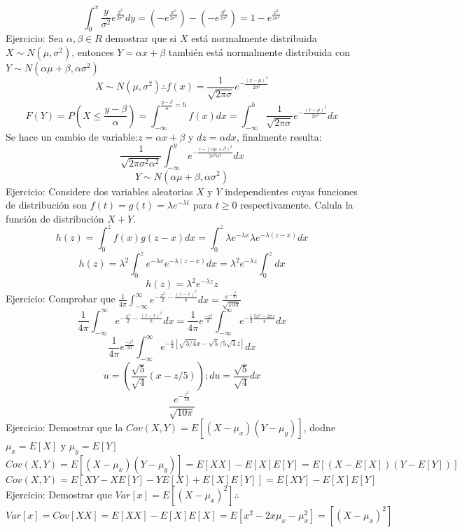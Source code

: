 \documentclass[11pt,fleqn]{book} %
\numberwithin{equation}{section} %
\numberwithin{figure}{section} %
\numberwithin{table}{section} %
\begin{document}
$$ \int_{0}^{x} \frac{y}{\sigma^{2}} e^{\frac{y^{2}}{2\sigma^{2}}} dy = (-e^{\frac{x^{2}}{2\sigma^{2}}}) - (-e^{\frac{0^{2}}{2\sigma^{2}}}) = 1 - e^{\frac{x^{2}}{2\sigma^{2}}} $$
Ejercicio: Sea $\alpha,\beta \in R$ demostrar que si $X$ está normalmente distribuida $X \sim N(\mu,\sigma^{2})$, entonces $Y = \alpha x + \beta$ también está normalmente distribuida con $Y \sim N(\alpha\mu + \beta,\alpha\sigma^{2})$
$$ X \sim N(\mu,\sigma^{2}) \therefore f(x) = \frac{1}{\sqrt{2 \pi \sigma}} e^{- \frac{(x - \mu)^{2}}{2 \sigma^{2}}} $$
$$ F(Y) = P(X \leq \frac{y-\beta}{\alpha}) = \int_{-\infty}^{\frac{y-\beta}{\alpha} = h} f(x) dx = \int_{-\infty}^{h} \frac{1}{\sqrt{2 \pi \sigma}} e^{- \frac{(x - \mu)^{2}}{2 \sigma^{2}}} dx $$
Se hace un cambio de variable:$z = \alpha x + \beta$ y $dz = \alpha dx$, finalmente resulta:
$$ \frac{1}{\sqrt{2 \pi \sigma^{2} \alpha^{2}}} \int_{-\infty}^{y}  e^{- \frac{z-(\alpha\mu + \beta)^{2}}{2 \sigma^{2} \alpha^{2}}} dx     $$
$$Y \sim N(\alpha\mu + \beta,\alpha\sigma^{2})$$
Ejercicio: Considere dos variables aleatorias $X$ y $Y$ independientes cuyas funciones de distribución son $f(t) = g(t) =  \lambda e^{-\lambda t} $ para $t \geq 0$ respectivamente. Calula la función de distribución $X + Y$.
$$ h(z) = \int_{0}^{z} f(x)g(z-x) dx = \int_{0}^{z} \lambda e^{-\lambda x}\lambda e^{-\lambda (z-x)} dx $$
$$ h(z) = \lambda^{2} \int_{0}^{z}  e^{-\lambda x}e^{-\lambda (z-x)}dx = \lambda^{2} e^{-\lambda z} \int_{0}^{z}  dx  $$
$$ h(z) = \lambda^{2} e^{-\lambda z} z  $$
Ejercicio: Comprobar que $\frac{1}{4\pi} \int_{-\infty}^{\infty} e^{-\frac{x^{2}}{2} - \frac{(z-x)^{2}}{8}} dx = \frac{e^{-\frac{z^{2}}{10}}}{\sqrt{10\pi}}$
$$ \frac{1}{4\pi} \int_{-\infty}^{\infty} e^{-\frac{x^{2}}{2} - \frac{(z-x)^{2}}{8}} dx =  \frac{1}{4\pi} e^{\frac{-z^{2}}{8}} \int_{-\infty}^{\infty} e^{-\frac{1}{2}\frac{5x^{2}-2xz}{4}} dx$$
$$ \frac{1}{4\pi} e^{\frac{-z^{2}}{10}} \int_{-\infty}^{\infty} e^{-\frac{1}{2}[\sqrt{3/4}x - \sqrt{5}/5\sqrt{4} z]} dx$$
$$ u = (\frac{\sqrt{5}}{\sqrt{4}} (x - z/5)); du = \frac{\sqrt{5}}{\sqrt{4}} dx $$
$$\frac{e^{-\frac{z^{2}}{10}}}{\sqrt{10\pi}}$$
Ejercicio: Demostrar que la $Cov(X,Y) = E[(X - \mu_{x})(Y - \mu_{y})]$, dodne $\mu_{x} = E[X] $ y $\mu_{y} = E[Y] $
$$ Cov(X,Y) = E[(X - \mu_{x})(Y - \mu_{y})] = E[XX] -E[X]E[Y] = E[(X - E[X])(Y - E[Y])]          $$
$$ Cov(X,Y) = E[XY - XE[Y] - YE[X] + E[X]E[Y]] = E[XY] - E[X]E[Y] $$
Ejercicio: Demostrar que $Var[x] = E[(X-\mu_{x})^{2}] \therefore$
$$ Var[x] = Cov[XX] = E[XX] - E[X]E[X] = E[x^{2} - 2x\mu_{x} - \mu_{x}^{2}] = [(X-\mu_{x})^{2}]        $$
\end{document}
